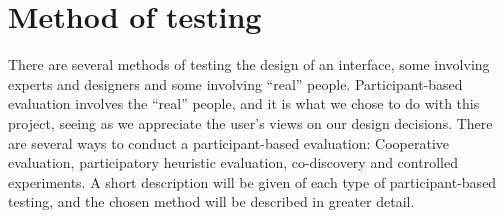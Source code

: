 \section{Method of testing}
There are several methods of testing the design of an interface, some involving experts and designers and some involving ``real'' people. Participant-based evaluation involves the ``real'' people, and it is what we chose to do with this project, seeing as we appreciate the user's views on our design decisions. There are several ways to conduct a participant-based evaluation: Cooperative evaluation, participatory heuristic evaluation, co-discovery and controlled experiments. A short description will be given of each type of participant-based testing, and the chosen method will be described in greater detail.



